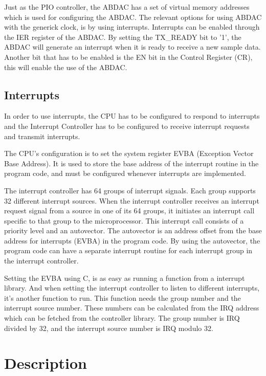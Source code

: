 \documentclass[12pt,a4paper,final]{report}
\numberwithin{equation}{section}
\numberwithin{table}{section}
\numberwithin{figure}{section}
\begin{document}
Just as the PIO controller, the ABDAC has a set of virtual memory addresses which is used for configuring the ABDAC. The relevant options for using ABDAC with the generick clock, is by using interrupts. Interrupts can be enabled through the IER register of the ABDAC. By setting the TX\_READY bit to '1', the ABDAC will generate an interrupt when it is ready to receive a new sample data. Another bit that has to be enabled is the EN bit in the Control Register (CR), this will enable the use of the ABDAC.


\subsection{Interrupts}
\label{sec:interrupts}

In order to use interrupts, the CPU has to be configured to respond to interrupts and the Interrupt Controller has to be configured to receive interrupt requests and transmit interrupts. 

The CPU's configuration is to set the system register EVBA (Exception Vector Base Address). It is used to store the base address of the interrupt routine in the program code, and must be configured whenever interrupts are implemented.

The interrupt controller has 64 groups of interrupt signals. Each group supports 32 different interrupt sources. When the interrupt controller receives an interrupt request signal from a source in one of its 64 groups, it initiates an interrupt call specific to that group to the microprocessor. This interrupt call consists of a priority level and an autovector. The autovector is an address offset from the base address for interrupts (EVBA) in the program code. By using the autovector, the program code can have a separate interrupt routine for each interrupt group in the interrupt controller. 

Setting the EVBA using C, is as easy as running a function from a interrupt library. And when setting the interrupt controller to listen to different interrupts, it's another function to run. This function needs the group number and the interrupt source number. These numbers can be calculated from the IRQ address which can be fetched from the controller library. The group number is IRQ divided by 32, and the interrupt source number is IRQ modulo 32.

\newpage

\section{Description}
\label{sec:description}
\end{document}
